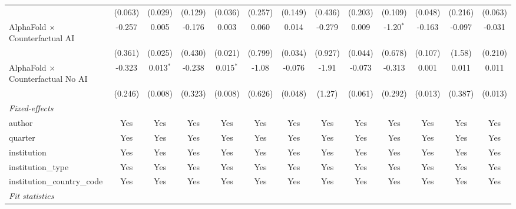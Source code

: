 \begin{tabular}{lcccccccccccc}
                                            & (0.063)       & (0.029)       & (0.129)       & (0.036)      & (0.257)      & (0.149)     & (0.436) & (0.203) & (0.109)     & (0.048) & (0.216)      & (0.063)\\   
   AlphaFold $\times$ Counterfactual AI     & -0.257        & 0.005         & -0.176        & 0.003        & 0.060        & 0.014       & -0.279  & 0.009   & -1.20$^{*}$ & -0.163  & -0.097       & -0.031\\   
                                            & (0.361)       & (0.025)       & (0.430)       & (0.021)      & (0.799)      & (0.034)     & (0.927) & (0.044) & (0.678)     & (0.107) & (1.58)       & (0.210)\\   
   AlphaFold $\times$ Counterfactual No AI  & -0.323        & 0.013$^{*}$   & -0.238        & 0.015$^{*}$  & -1.08        & -0.076      & -1.91   & -0.073  & -0.313      & 0.001   & 0.011        & 0.011\\   
                                            & (0.246)       & (0.008)       & (0.323)       & (0.008)      & (0.626)      & (0.048)     & (1.27)  & (0.061) & (0.292)     & (0.013) & (0.387)      & (0.013)\\   
   \midrule
   \emph{Fixed-effects}\\
   author                                   & Yes           & Yes           & Yes           & Yes          & Yes          & Yes         & Yes     & Yes     & Yes         & Yes     & Yes          & Yes\\  
   quarter                                  & Yes           & Yes           & Yes           & Yes          & Yes          & Yes         & Yes     & Yes     & Yes         & Yes     & Yes          & Yes\\  
   institution                              & Yes           & Yes           & Yes           & Yes          & Yes          & Yes         & Yes     & Yes     & Yes         & Yes     & Yes          & Yes\\  
   institution\_type                        & Yes           & Yes           & Yes           & Yes          & Yes          & Yes         & Yes     & Yes     & Yes         & Yes     & Yes          & Yes\\  
   institution\_country\_code               & Yes           & Yes           & Yes           & Yes          & Yes          & Yes         & Yes     & Yes     & Yes         & Yes     & Yes          & Yes\\  
   \midrule
   \emph{Fit statistics}\\

\end{tabular}
